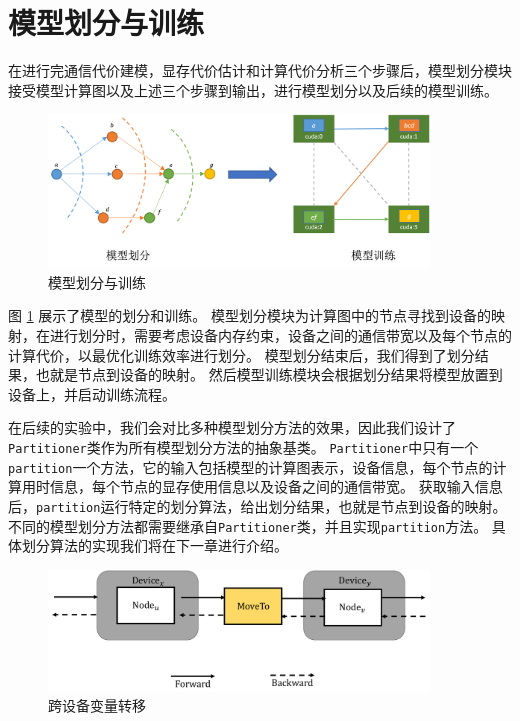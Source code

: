 \section{模型划分与训练}
\label{sec:partition-and-train}
在进行完通信代价建模，显存代价估计和计算代价分析三个步骤后，模型划分模块接受模型计算图以及上述三个步骤到输出，进行模型划分以及后续的模型训练。
\begin{figure}[h]
	\centering
	\includegraphics[width=0.9\textwidth]{./figure/3-system/partition_train.png}
	\caption{模型划分与训练}
	\label{fig:partition-and-train}
\end{figure}

图 \ref{fig:partition-and-train} 展示了模型的划分和训练。
模型划分模块为计算图中的节点寻找到设备的映射，在进行划分时，需要考虑设备内存约束，设备之间的通信带宽以及每个节点的计算代价，以最优化训练效率进行划分。
模型划分结束后，我们得到了划分结果，也就是节点到设备的映射。
然后模型训练模块会根据划分结果将模型放置到设备上，并启动训练流程。

在后续的实验中，我们会对比多种模型划分方法的效果，因此我们设计了\texttt{Partitioner}类作为所有模型划分方法的抽象基类。
\texttt{Partitioner}中只有一个\texttt{partition}一个方法，它的输入包括模型的计算图表示，设备信息，每个节点的计算用时信息，每个节点的显存使用信息以及设备之间的通信带宽。
获取输入信息后，\texttt{partition}运行特定的划分算法，给出划分结果，也就是节点到设备的映射。
不同的模型划分方法都需要继承自\texttt{Partitioner}类，并且实现\texttt{partition}方法。
具体划分算法的实现我们将在下一章进行介绍。

\begin{figure}[!h]
	\centering
	\includegraphics[width=0.9\textwidth]{./figure/3-system/moveTo.pdf}
	\caption{跨设备变量转移}
	\label{fig:move}
\end{figure}

